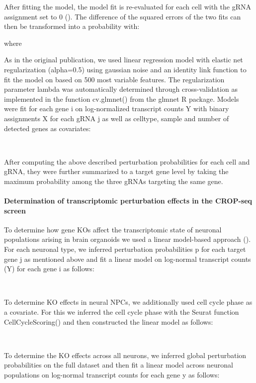  
After fitting the model, the model fit is re-evaluated for each cell with the gRNA assignment set to 0 (). The difference of the squared errors of the two fits can then be transformed into a probability with:
 
             
 
            where  
 
As in the original publication, we used linear regression model with elastic net regularization (alpha=0.5) using gaussian noise and an identity link function to fit the model on  based on 500 most variable features. The regularization parameter lambda was automatically determined through cross-validation as implemented in the function  cv.glmnet() from the glmnet R package. Models were fit for each gene i on log-normalized transcript counts Y with binary assignments X for each gRNA j as well as celltype, sample and number of detected genes as covariates:
 
             ~
 
After computing the above described perturbation probabilities for each cell and gRNA, they were further summarized to a target gene level by taking the maximum probability among the three gRNAs targeting the same gene.
 
 
\paragraph{Determination of transcriptomic perturbation effects in the CROP-seq screen}
To determine how gene KOs affect the transcriptomic state of neuronal populations arising in brain organoids we used a linear model-based approach (\cite{dixit_perturb-seq_2016}). For each neuronal type, we inferred perturbation probabilities p for each target gene j as mentioned above  and fit a linear model on log-normal transcript counts (Y) for each gene i as follows:
 
             ~
 
To determine KO effects in neural NPCs, we additionally used cell cycle phase as a covariate. For this we inferred the cell cycle phase with the Seurat function CellCycleScoring() and then constructed the linear model as follows:
 
             ~
 
To determine the KO effects across all neurons, we inferred global perturbation probabilities on the full dataset and then fit a linear model across neuronal populations on log-normal transcript counts for each gene y as follows:
 
